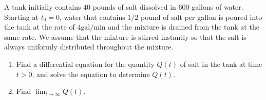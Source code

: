 \documentclass[12pt,a4paper]{article}
\newcounter{example}[section]
\begin{document}
\begin{example}
A tank initially contains $40$ pounds of salt dissolved in $600$ gallons of water. Starting at $t_0 = 0$, water that contains $1/2$ pound of salt per gallon is poured into the tank at the rate of $4 \text{gal}/\text{min}$ and the mixture is drained from the tank at the same rate. We assume that the mixture is stirred instantly so that the salt is always uniformly distributed throughout the mixture.
\begin{enumerate}
\item Find a differential equation for the quantity $Q(t)$ of salt in the tank at time $t > 0$, and solve the equation to determine $Q(t)$.
\item Find $\lim_{t \rightarrow \infty} Q(t)$.
\end{enumerate}
\end{example}

\newpage

\phantom{2}
\end{document}
